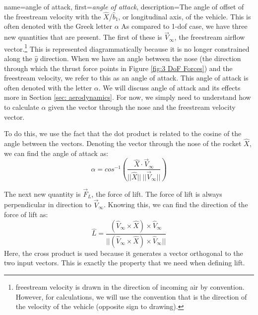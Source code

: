 \documentclass[12pt]{report}
\begin{document}
{
    name=angle of attack,
    first={\textit{angle of attack}},
    description={The angle of offset of the freestream velocity with the $\hat{X}$/$\hat{b}_1$, or longitudinal axis, of the vehicle. This is often denoted with the Greek letter $\alpha$}
}
As compared to 1-\gls{dof} case, we have three new quantities that are present. The first of these is $\vec{V}_{\infty}$, the freestream airflow vector.\footnote{\gls{freestream} velocity  is drawn in the direction of incoming air by convention. However, for calculations, we will use the convention that  is the direction of the velocity of the vehicle (opposite sign to drawing).} This is represented diagrammatically because it is no longer constrained along the $\hat{y}$ direction. When we have an angle between the nose (the direction through which the thrust force points in Figure \ref{fig:3 DoF Forces}) and the \gls{freestream} velocity, we refer to this as an \gls{angle of attack}. This \gls{angle of attack} is often denoted with the letter $\alpha$. We will discuss \gls{angle of attack} and its effects more in Section \ref{sec: aerodynamics}. For now, we simply need to understand how to calculate $\alpha$ given the vector through the nose and the \gls{freestream} velocity vector.

To do this, we use the fact that the dot product is related to the cosine of the angle between the vectors. Denoting the vector through the nose of the rocket $\hat{X}$, we can find the \gls{angle of attack} as:
\begin{equation}\label{eq:alpha}
    \alpha=cos^{-1}\left(\frac{\hat{X}\cdot \vec{V}_{\infty}}{||\hat{X}||\ ||\vec{V}_{\infty}||}\right)
\end{equation}

The next new quantity is $\vec{F}_L$, the force of lift. The force of lift is always perpendicular in direction to $\vec{V}_{\infty}$. Knowing this, we can find the direction of the force of lift as:
\begin{equation}\label{eq:Lift}
    \hat{L}=\frac{(\hat{V}_{\infty} \times \hat{X}) \times \hat{V}_{\infty}}{||(\hat{V}_{\infty} \times \hat{X}) \times \hat{V}_{\infty}||}
\end{equation}
Here, the cross product is used because it generates a vector orthogonal to the two input vectors. This is exactly the property that we need when defining lift.
\end{document}
